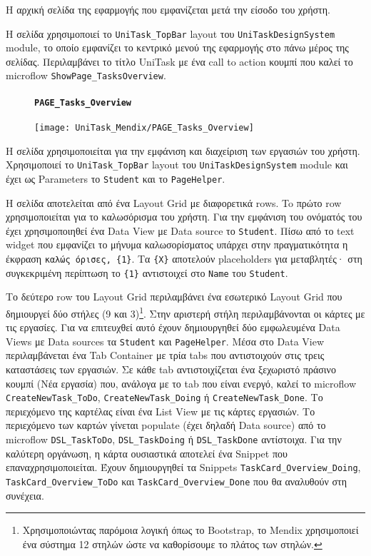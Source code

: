                 Η αρχική σελίδα της εφαρμογής που εμφανίζεται μετά την είσοδο του χρήστη.

                Η σελίδα χρησιμοποιεί το \texttt{UniTask\_TopBar} layout του \texttt{UniTaskDesignSystem} module, το οποίο εμφανίζει το κεντρικό μενού της εφαρμογής στο πάνω μέρος της σελίδας. Περιλαμβάνει το τίτλο {\ZonaSB UniTask} με ένα call to action κουμπί που καλεί το microflow \texttt{ShowPage\_TasksOverview}.

                \begin{figure}[H] \noindent
                    \paragraph{\texttt{PAGE\_Tasks\_Overview}}
                    \begin{center}
                        \texttt{[image: UniTask\_Mendix/PAGE\_Tasks\_Overview]}
                    \end{center}
                \end{figure}

                Η σελίδα χρησιμοποιείται για την εμφάνιση και διαχείριση των εργασιών του χρήστη. Χρησιμοποιεί το \texttt{UniTask\_TopBar} layout του \texttt{UniTaskDesignSystem} module και έχει ως Parameters το \texttt{Student} και το \texttt{PageHelper}.

                Η σελίδα αποτελείται από ένα Layout Grid με διαφορετικά rows. To πρώτο row χρησιμοποιείται για το καλωσόρισμα του χρήστη. Για την εμφάνιση του ονόματός του έχει χρησιμοποιηθεί ένα Data View με Data source το \texttt{Student}. Πίσω από το text widget που εμφανίζει το μήνυμα καλωσορίσματος υπάρχει στην πραγματικότητα η έκφραση \verb|καλώς όρισες, {1}|. Τα \verb|{X}| αποτελούν placeholders για μεταβλητές· στη συγκεκριμένη περίπτωση το \verb|{1}| αντιστοιχεί στο \texttt{Name} του \texttt{Student}.

                Το δεύτερο row του Layout Grid περιλαμβάνει ένα εσωτερικό Layout Grid που δημιουργεί δύο στήλες (9 και 3)\footnote{Χρησιμοποιώντας παρόμοια λογική όπως το Bootstrap, το Mendix χρησιμοποιεί ένα σύστημα 12 στηλών ώστε να καθορίσουμε το πλάτος των στηλών.}. Στην αριστερή στήλη περιλαμβάνονται οι κάρτες με τις εργασίες. Για να επιτευχθεί αυτό έχουν δημιουργηθεί δύο εμφωλευμένα Data Views με Data sources τα \texttt{Student} και \texttt{PageHelper}. Μέσα στο Data View περιλαμβάνεται ένα Tab Container με τρία tabs που αντιστοιχούν στις τρεις καταστάσεις των εργασιών. Σε κάθε tab αντιστοιχίζεται ένα ξεχωριστό πράσινο κουμπί ({\Zona Νέα εργασία}) που, ανάλογα με το tab που είναι ενεργό, καλεί το microflow \texttt{CreateNewTask\_ToDo}, \texttt{CreateNewTask\_Doing} ή \texttt{CreateNewTask\_Done}. Το περιεχόμενο της καρτέλας είναι ένα List View με τις κάρτες εργασιών. Το περιεχόμενο των καρτών γίνεται populate (έχει δηλαδή Data source) από το microflow \texttt{DSL\_TaskToDo}, \texttt{DSL\_TaskDoing} ή \texttt{DSL\_TaskDone} αντίστοιχα. Για την καλύτερη οργάνωση, η κάρτα ουσιαστικά αποτελεί ένα Snippet που επαναχρησιμοποιείται. Έχουν δημιουργηθεί τα Snippets \texttt{TaskCard\_Overview\_Doing}, \texttt{TaskCard\_Overview\_ToDo} και \texttt{TaskCard\_Overview\_Done} που θα αναλυθούν στη συνέχεια.

